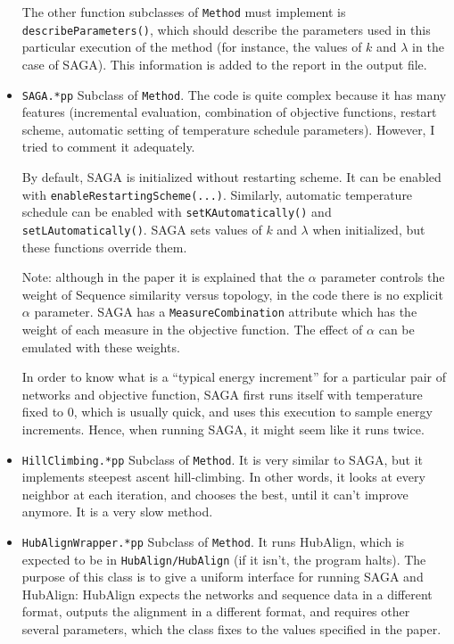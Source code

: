 \documentclass[]{article}
\begin{document}
\begin{itemize}
The other function subclasses of \texttt{Method} must implement is \texttt{describeParameters()}, which should describe the parameters used in this particular execution of the method (for instance, the values of $k$ and $\lambda$ in the case of SAGA). This information is added to the report in the output file.

\item \texttt{SAGA.*pp} Subclass of \texttt{Method}. The code is quite complex because it has many features (incremental evaluation, combination of objective functions, restart scheme, automatic setting of temperature schedule parameters). However, I tried to comment it adequately.

By default, SAGA is initialized without restarting scheme. It can be enabled with \texttt{enableRestartingScheme(...)}. Similarly, automatic temperature schedule can be enabled with \texttt{setKAutomatically()} and \texttt{setLAutomatically()}. SAGA sets values of $k$ and $\lambda$ when initialized, but these functions override them.

Note: although in the paper it is explained that the $\alpha$ parameter controls the weight of Sequence similarity versus topology, in the code there is no explicit $\alpha$ parameter. SAGA has a \texttt{MeasureCombination} attribute which has the weight of each measure in the objective function. The effect of $\alpha$ can be emulated with these weights.

In order to know what is a ``typical energy increment'' for a particular pair of networks and objective function, SAGA first runs itself with temperature fixed to 0, which is usually quick, and uses this execution to sample energy increments. Hence, when running SAGA, it might seem like it runs twice.

\item \texttt{HillClimbing.*pp} Subclass of \texttt{Method}. It is very similar to SAGA, but it implements steepest ascent hill-climbing. In other words, it looks at every neighbor at each iteration, and chooses the best, until it can't improve anymore. It is a very slow method.

\item \texttt{HubAlignWrapper.*pp} Subclass of \texttt{Method}. It runs HubAlign, which is expected to be in \texttt{HubAlign/HubAlign} (if it isn't, the program halts). The purpose of this class is to give a uniform interface for running SAGA and HubAlign: HubAlign expects the networks and sequence data in a different format, outputs the alignment in a different format, and requires other several parameters, which the class fixes to the values specified in the paper.


\end{itemize}
\end{document}
